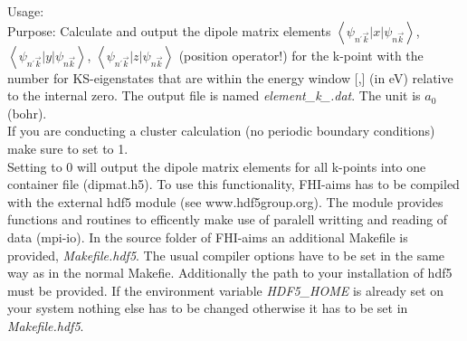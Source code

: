 {
  \noindent
  Usage:    \\[1.0ex]
  Purpose: Calculate and output the dipole matrix elements $\left\langle\psi_{n^{'}\vec{k}}\vert x\vert\psi_{n\vec{k}}\right\rangle$, 
  $\left\langle\psi_{n^{'}\vec{k}}\vert y\vert\psi_{n\vec{k}}\right\rangle$, $\left\langle\psi_{n^{'}\vec{k}}\vert z\vert\psi_{n\vec{k}}\right\rangle$
  (position operator!) for the k-point with the number  for KS-eigenstates that are within the energy window [,] (in eV) relative to the 
  internal zero. The output file is named \textit{element\_k\_}\textit{.dat}. The unit is $a_0$ (bohr).\\
  If you are conducting a cluster calculation (no periodic boundary conditions) make sure to set  to 1.\\
  Setting  to 0 will output the dipole matrix elements for all k-points into one container file (dipmat.h5). To use this functionality, FHI-aims 
  has to be compiled with the external hdf5 module (see www.hdf5group.org). The module provides functions and routines to efficently make use of paralell 
  writting and reading of data (mpi-io). In the source folder of FHI-aims an additional Makefile is provided, \textit{Makefile.hdf5}. The usual compiler options have to 
  be set in the same way as in the normal Makefie. Additionally the path to your installation of hdf5 must be provided. If the environment variable \textit{HDF5\_HOME} is 
  already set on your system nothing else has to be changed otherwise it has to be set in \textit{Makefile.hdf5}.\\[1.0ex]
}
